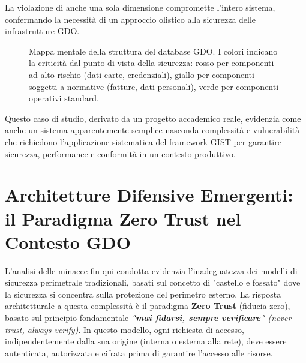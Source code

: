 La violazione di anche una sola dimensione compromette l'intero sistema, confermando la necessità di un approccio olistico alla sicurezza delle infrastrutture GDO.

\begin{figure}[htbp]
\centering
{}
\caption{Mappa mentale della struttura del database GDO. I colori indicano la criticità dal punto di vista della sicurezza: rosso per componenti ad alto rischio (dati carte, credenziali), giallo per componenti soggetti a normative (fatture, dati personali), verde per componenti operativi standard.}
\label{fig:database_mindmap}
\end{figure}

Questo caso di studio, derivato da un progetto accademico reale, evidenzia come anche un sistema apparentemente semplice nasconda complessità e vulnerabilità che richiedono l'applicazione sistematica del framework GIST per garantire sicurezza, performance e conformità in un contesto produttivo.

\section{\texorpdfstring{\textbf{Architetture Difensive Emergenti: il Paradigma Zero Trust nel Contesto GDO}}{2.4 - Architetture Difensive Emergenti: il Paradigma Zero Trust nel Contesto GDO}}

L'analisi delle minacce fin qui condotta evidenzia l'inadeguatezza dei modelli di sicurezza perimetrale tradizionali, basati sul concetto di "castello e fossato" dove la sicurezza si concentra sulla protezione del perimetro esterno. La risposta architetturale a questa complessità è il paradigma \textbf{Zero Trust} (fiducia zero), basato sul principio fondamentale \emph{\textbf{"mai fidarsi, sempre verificare"} (never trust, always verify)}. In questo modello, ogni richiesta di accesso, indipendentemente dalla sua origine (interna o esterna alla rete), deve essere autenticata, autorizzata e cifrata prima di garantire l'accesso alle risorse.

